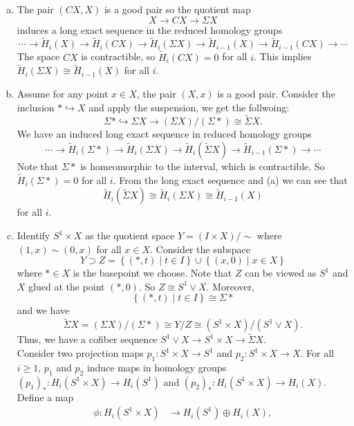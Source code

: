 \documentclass[a4paper, 12pt]{article}
\begin{document}
\begin{solution}
\begin{enumerate}[(a)]
\item The pair \((CX,X)\) is a good pair so the quotient map 
\[X\rightarrow CX\rightarrow \Sigma X\]
induces a long exact sequence in the reduced homology groups 
\[\cdots\rightarrow \tilde{H}_i(X)\rightarrow \tilde{H}_i(CX)\rightarrow \tilde{H}_i(\Sigma X)\rightarrow \tilde{H}_{i-1}(X)\rightarrow \tilde{H}_{i-1}(CX)\rightarrow \cdots\]
The space \(CX\) is contractible, so \(\tilde{H}_i(CX)=0\) for all \(i\). This implies \(\tilde{H}_i(\Sigma X)\cong \tilde{H}_{i-1}(X) \) for all \(i\). 
\item Assume for any point \(x\in X\), the pair \((X,x)\) is a good pair. Consider the inclusion \(*\hookrightarrow X\) and apply the suspension, we get the follwoing:
\[\Sigma *\hookrightarrow \Sigma X\rightarrow (\Sigma X)/(\Sigma *)\cong \tilde{\Sigma} X.\]
We have an induced long exact sequence in reduced homology groups 
\[\cdots\rightarrow \tilde{H}_i(\Sigma *)\rightarrow \tilde{H}_i(\Sigma X)\rightarrow \tilde{H}_i(\tilde{\Sigma }X)\rightarrow \tilde{H}_{i-1}(\Sigma *)\rightarrow \cdots\]
Note that \(\Sigma *\) is homeomorphic to the interval, which is contractible. So \(\tilde{H}_i(\Sigma *)=0\) for all \(i\). From the long exact sequence and (a) we can see that 
\[\tilde{H}_i(\tilde{\Sigma}X)\cong \tilde{H}_i(\Sigma X)\cong \tilde{H}_{i-1}(X)\]
for all \(i\). 
\item Identify \(S^1\times X\) as the quotient space \(Y=(I\times X)/\sim\) where \((1,x)\sim (0,x)\) for all \(x\in X\). Consider the subspace 
\[Y\supset Z=\left\{(*,t)\mid t\in I  \right\}\cup \left\{ (x,0)\mid x\in X \right\}\] 
where \(*\in X\) is the basepoint we choose. Note that \(Z\) can be viewed as \(S^1\) and \(X\) glued at the point \((*,0)\). So \(Z\cong S^1\vee X\). Moreover, 
\[\left\{ (*,t)\mid t\in I \right\}\cong \Sigma *\]
and we have 
\[\tilde{\Sigma} X=(\Sigma X)/(\Sigma *)\cong Y/Z\cong (S^1\times X)/(S^1\vee X).\]
Thus, we have a cofiber sequence \(S^1\vee X\rightarrow S^1\times X\rightarrow \tilde{\Sigma} X\).\\ 
Consider two projection maps \(p_1:S^1\times X\rightarrow S^1\) and \(p_2:S^1\times X\rightarrow X\). For all \(i\geq 1\), \(p_1\) and \(p_2\) induce maps in homology groups 
\((p_1)_*:H_i(S^1\times X)\rightarrow H_i(S^1)\) and \((p_2)_*:H_i(S^1\times X)\rightarrow H_i(X)\). Define a map 
\begin{align*}
    \phi:H_i(S^1\times X)&\rightarrow H_i(S^1)\oplus H_i(X),\\ 

\end{align*}
\end{enumerate}
\end{solution}
\end{document}
